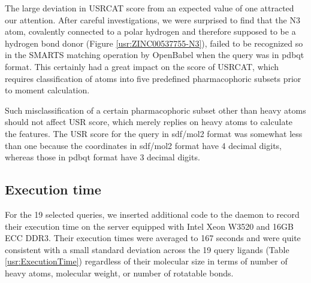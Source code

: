 The large deviation in USRCAT score from an expected value of one attracted our attention. After careful investigations, we were surprised to find that the N3 atom, covalently connected to a polar hydrogen and therefore supposed to be a hydrogen bond donor (Figure \ref{usr:ZINC00537755-N3}), failed to be recognized so in the SMARTS matching operation by OpenBabel \citep{968} when the query was in pdbqt format. This certainly had a great impact on the score of USRCAT, which requires classification of atoms into five predefined pharmacophoric subsets prior to moment calculation.

Such misclassification of a certain pharmacophoric subset other than heavy atoms should not affect USR score, which merely replies on heavy atoms to calculate the features. The USR score for the query in sdf/mol2 format was somewhat less than one because the coordinates in sdf/mol2 format have 4 decimal digits, whereas those in pdbqt format have 3 decimal digits.

\subsection{Execution time}

For the 19 selected queries, we inserted additional code to the daemon to record their execution time on the server equipped with Intel Xeon W3520 and 16GB ECC DDR3. Their execution times were averaged to 167 seconds and were quite consistent with a small standard deviation across the 19 query ligands (Table \ref{usr:ExecutionTime}) regardless of their molecular size in terms of number of heavy atoms, molecular weight, or number of rotatable bonds.

